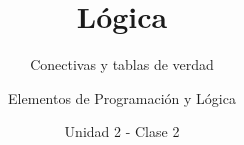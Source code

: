 \documentclass[usenames,dvipsnames]{../../common/beamerUNQ}
\title{Lógica}
\subtitle{Conectivas y tablas de verdad}
\author{Elementos de Programación y Lógica}
\date{Unidad 2 - Clase 2}
\begin{document}
  \titleframe
  \toc
  
  \finaltitleframe
\end{document}
